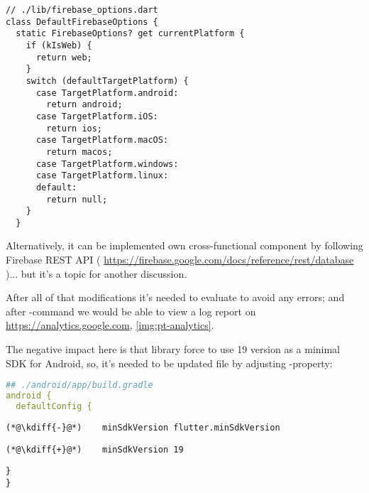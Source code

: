 \begin{lstlisting}
// ./lib/firebase_options.dart
class DefaultFirebaseOptions {
  static FirebaseOptions? get currentPlatform {
    if (kIsWeb) {
      return web;
    }
    switch (defaultTargetPlatform) {
      case TargetPlatform.android:
        return android;
      case TargetPlatform.iOS:
        return ios;
      case TargetPlatform.macOS:
        return macos;
      case TargetPlatform.windows:
      case TargetPlatform.linux:
      default:
        return null;
    }
  }
\end{lstlisting}

Alternatively, it can be implemented own cross-functional component by following Firebase REST API (
\href{https://firebase.google.com/docs/reference/rest/database}{https://firebase.google.com/docs/reference/rest/database}
)... but it's a topic for another discussion.

After all of that modifications it's needed to evaluate  to avoid any errors; and after 
-command we would be able to view a log report on 
\href{https://analytics.google.com}{https://analytics.google.com}, \cref{img:pt-analytics}.


The negative impact here is that  library force to use 19 version as a minimal SDK for Android, 
so, it's needed to be updated  file by adjusting -property:

\begin{lstlisting}[language=yaml]
## ./android/app/build.gradle
android {
  defaultConfig {
\end{lstlisting}
{
\xpretocmd{\lstlisting}{\vspace{-12pt}}{}{}
\begin{lstlisting}[firstnumber=4, backgroundcolor=\color{backred}]
(*@\kdiff{-}@*)    minSdkVersion flutter.minSdkVersion
\end{lstlisting}
\begin{lstlisting}[firstnumber=4, backgroundcolor=\color{backgreen}]
(*@\kdiff{+}@*)    minSdkVersion 19
\end{lstlisting}
\begin{lstlisting}[firstnumber=5]
  }
}
\end{lstlisting}
}

